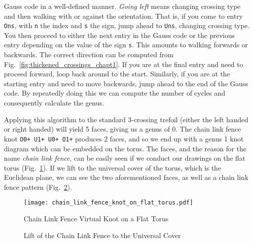         Gauss code in a well-defined manner. \textit{Going left} means changing
        crossing type and then walking with or against the orientation.
        That is, if you come to entry \texttt{Ons}, with \texttt{n} the index
        and \texttt{s} the sign, jump ahead to \texttt{Uns}, changing crossing
        type. You then proceed to either the next entry in the Gauss code or
        the previous entry depending on the value of the sign \texttt{s}.
        This amounts to walking forwards or backwards. The correct direction
        can be computed from Fig.~\ref{fig:thickened_crossings_chapt1}.
        If you are at the final entry and need to proceed forward,
        loop back around to the
        start. Similarly, if you are at the starting entry and need to move
        backwards, jump ahead to the end of the Gauss code. By repeatedly
        doing this we can compute the number of cycles and consequently
        calculate the genus.
        \par\hfill\par
        Applying this algorithm to the standard 3-crossing trefoil (either the
        left handed or right handed) will yield 5 faces, giving us a genus of
        0. The chain link fence knot \texttt{O0+ U1+ U0+ O1+} produces 2 faces,
        and so we end up with a genus 1 knot diagram which can be embedded on
        the torus. The faces, and the reason for the name
        \textit{chain link fence}, can be easily seen if we conduct our drawings
        on the flat torus (Fig.~\ref{fig:chain_link_fence_knot_on_flat_torus}).
        If we lift to the universal cover of the torus, which is the Euclidean
        plane, we can see the two aforementioned faces, as well as a chain
        link fence pattern
        (Fig.~\ref{fig:chain_link_fence_knot_on_flat_torus_universal_cover}).
        \begin{figure}
            \centering
            \texttt{[image: chain\_link\_fence\_knot\_on\_flat\_torus.pdf]}
            \caption{Chain Link Fence Virtual Knot on a Flat Torus}
            \label{fig:chain_link_fence_knot_on_flat_torus}
        \end{figure}
        \begin{figure}
            \centering
            \caption{Lift of the Chain Link Fence to the Universal Cover}
            \label{fig:chain_link_fence_knot_on_flat_torus_universal_cover}
        \end{figure}
